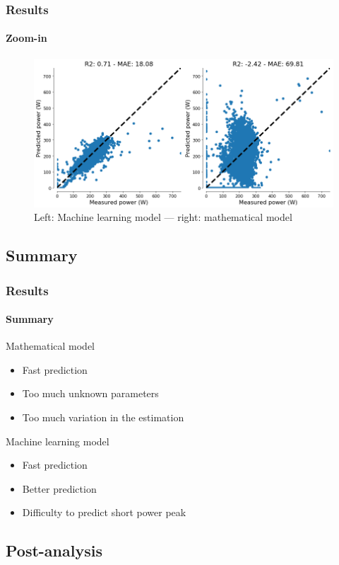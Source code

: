 \documentclass{beamer}
\newcommand{\tick}{\color{green!60!black!80}\ding{51}}
\newcommand{\cross}{\color{red!60!black!80}\ding{55}}
\begin{document}
\begin{frame}
  \frametitle{Results}
  \framesubtitle{Zoom-in}
  \begin{figure}
    \includegraphics[width=.95\textwidth]{./images/uphill-r2.png}
    \caption{Left: Machine learning model --- right: mathematical model}
  \end{figure}
\end{frame}

\subsection{Summary}

\begin{frame}
  \frametitle{Results}
  \framesubtitle{Summary}
  \begin{block}{\small Mathematical model}
    \begin{itemize}\small
    \item[\tick] Fast prediction
    \item[\cross] Too much unknown parameters
    \item[\cross] Too much variation in the estimation
    \end{itemize}
  \end{block}
  \begin{block}{\small Machine learning model}
    \begin{itemize}\small
    \item[\tick] Fast prediction
    \item[\tick] Better prediction 
    \item[\cross] Difficulty to predict short power peak
    \end{itemize}
  \end{block}
\end{frame}

\subsection{Post-analysis}
\end{document}
